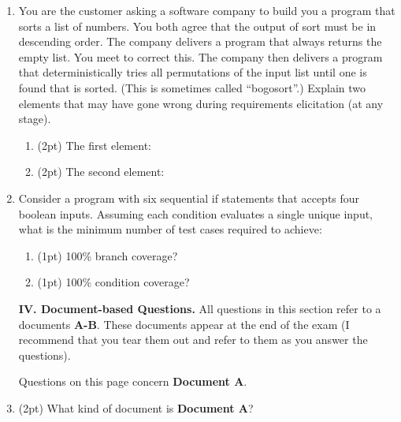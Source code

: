 \documentclass{report}
\newif\ifkey
\newcommand{\answershort}[1]{\ifkey\color{red}\underline{\textbf{#1}}\color{black}\else\underline{\hspace{3in}}\fi\xspace}
\newcommand{\answerlong}[1]{\ifkey\color{red}\textbf{#1}\color{black}\else\vspace{0.5in}\fi\xspace}
\newcommand*{\pts}[1]{\addtocounter{points}{#1}(#1pt)}
\begin{document}
\begin{spacing}{1.4}
\begin{enumerate}[leftmargin=*]
\item You are the customer asking a software company to build you a program that
  sorts a list of numbers. You both agree that the output of sort must be in descending order.
  The company delivers a program that always returns the empty list. You meet to correct
  this. The company then delivers a program that deterministically tries all permutations
  of the input list until one is found that is sorted. (This is sometimes called “bogosort”.)
  Explain two elements that may have gone wrong during requirements
  elicitation (at any stage).
  \begin{enumerate}
  \item \pts{2} The first element:\\
    \answerlong{There was an omission in the functional requirements: the customer failed to state that
      the returned list must have the same elements as the input list.}
  \item \pts{2} The second element:\\
    \answerlong{Quality requirements were not discussed: bogosort is O(n!), which is much slower than
      sorting a list ought to be (O(nlogn)). Other well-reasoned answers are also possible.}
    \end{enumerate}

\item Consider a program with six sequential if statements that accepts four boolean
inputs. Assuming each condition evaluates a single unique input, what is the minimum
number of test cases required to achieve:
\begin{enumerate}
\item \pts{1} 100\% branch coverage? \answershort{2: one that causes each branch to evaluate to false, and another that causes each branch to evaluate to true}
\item \pts{1} 100\% condition coverage? \answershort{12 = 2*6}
\end{enumerate}
  
    \newpage
    \textbf{IV. Document-based Questions.} All questions in this section refer to a documents \textbf{A-B}.
    These documents appear at the end of the exam (I recommend that you tear them out and refer to them as you answer the questions).

    Questions on this page concern \textbf{Document A}.
    
    \item \pts{2} What kind of document is \textbf{Document A}? \\ \answershort{postmortem}


\end{enumerate}
\end{spacing}
\end{document}
